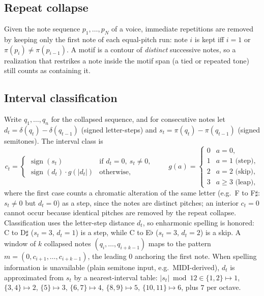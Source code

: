 \documentclass{article}
\begin{document}
\subsection*{Repeat collapse}
Given the note sequence $p_1,\dots,p_N$ of a voice, immediate repetitions are removed by keeping only the first note of each equal-pitch run: note $i$ is kept iff $i = 1$ or $\pi(p_i) \neq \pi(p_{i-1})$. A motif is a contour of \emph{distinct} successive notes, so a realization that restrikes a note inside the motif span (a tied or repeated tone) still counts as containing it.

\subsection*{Interval classification}
Write $q_1,\dots,q_n$ for the collapsed sequence, and for consecutive notes let $d_t = \delta(q_t) - \delta(q_{t-1})$ (signed letter-steps) and $s_t = \pi(q_t) - \pi(q_{t-1})$ (signed semitones). The interval class is
\begin{equation}
  c_t =
  \begin{cases}
    \operatorname{sign}(s_t) & \text{if } d_t = 0,\ s_t \neq 0,\\
    \operatorname{sign}(d_t)\cdot g(|d_t|) & \text{otherwise,}
  \end{cases}
  \qquad
  g(a) =
  \begin{cases}
    0 & a = 0,\\
    1 & a = 1 \text{ (step)},\\
    2 & a = 2 \text{ (skip)},\\
    3 & a \geq 3 \text{ (leap)},
  \end{cases}
  \label{eq:classify}
\end{equation}
where the first case counts a chromatic alteration of the same letter (e.g.\ F to F$\sharp$: $s_t \neq 0$ but $d_t = 0$) as a step, since the notes are distinct pitches; an interior $c_t = 0$ cannot occur because identical pitches are removed by the repeat collapse. Classification uses the letter-step distance $d_t$, so enharmonic spelling is honored: C to D$\sharp$ ($s_t{=}3$, $d_t{=}1$) is a step, while C to E$\flat$ ($s_t{=}3$, $d_t{=}2$) is a skip. A window of $k$ collapsed notes $(q_i,\dots,q_{i+k-1})$ maps to the pattern $m = (0, c_{i+1}, \dots, c_{i+k-1})$, the leading $0$ anchoring the first note. When spelling information is unavailable (plain semitone input, e.g.\ MIDI-derived), $d_t$ is approximated from $s_t$ by a nearest-interval table: $|s_t| \bmod 12 \in \{1,2\} \mapsto 1$, $\{3,4\} \mapsto 2$, $\{5\} \mapsto 3$, $\{6,7\} \mapsto 4$, $\{8,9\} \mapsto 5$, $\{10,11\} \mapsto 6$, plus $7$ per octave.
\end{document}
